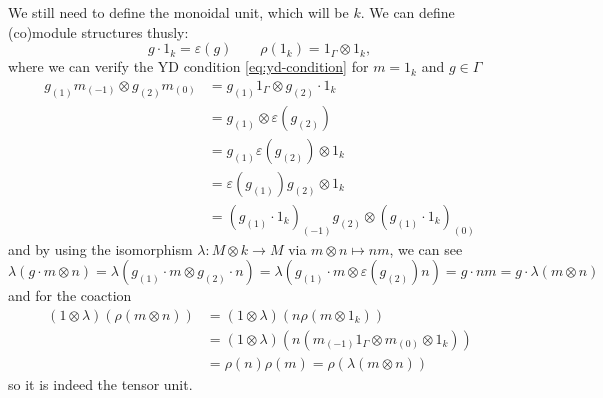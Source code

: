 \documentclass [11pt, proquest] {uwthesis}[2020/02/24]
\begin{document}
    We still need to define the monoidal unit, which will be $k$. We can define (co)module structures thusly:
    \[g\cdot 1_k=\varepsilon(g)\qquad \rho(1_k)=1_\Gamma\otimes 1_k,\]
    where we can verify the YD condition \eqref{eq:yd-condition} for $m=1_k$ and $g\in \Gamma$
    \begin{align*}
        g_{(1)}m_{(-1)}\otimes g_{(2)}m_{(0)}&= g_{(1)}1_\Gamma\otimes g_{(2)}\cdot 1_k\\
        &= g_{(1)}\otimes \varepsilon(g_{(2)})\\
        &= g_{(1)}\varepsilon(g_{(2)})\otimes 1_k\\
        &= \varepsilon(g_{(1)})g_{(2)}\otimes 1_k\\
        &= (g_{(1)}\cdot 1_k)_{(-1)}g_{(2)}\otimes (g_{(1)}\cdot 1_k)_{(0)}
    \end{align*}
    and by using the isomorphism $\lambda:M\otimes k\to M$ via $m\otimes n\mapsto nm$, we can see
    \[\lambda(g\cdot m\otimes n)=\lambda(g_{(1)}\cdot m\otimes g_{(2)}\cdot n)=\lambda(g_{(1)}\cdot m\otimes\varepsilon(g_{(2)})n)=g\cdot nm=g\cdot\lambda(m\otimes n)\]
    and for the coaction
    \begin{align*}
        (1\otimes\lambda)(\rho(m\otimes n))&=(1\otimes\lambda)(n\rho(m\otimes 1_k))\\
        &=(1\otimes\lambda)(n(m_{(-1)}1_\Gamma\otimes m_{(0)}\otimes 1_k))\\
        &=\rho(n)\rho(m)=\rho(\lambda(m\otimes n))
    \end{align*}
    so it is indeed the tensor unit.
\end{document}
